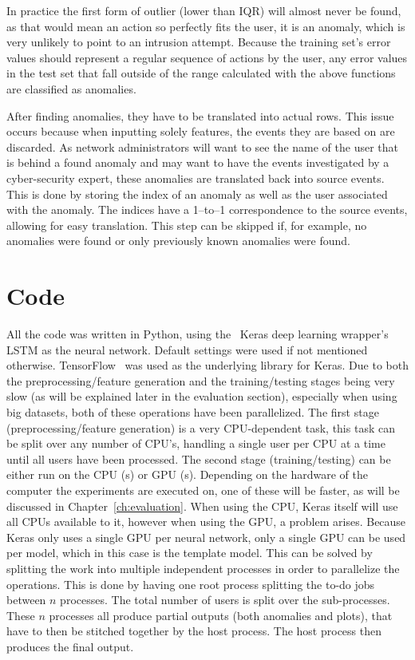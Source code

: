 In practice the first form of outlier (lower than IQR) will almost never be found, as that would mean an action so perfectly fits the user, it is an anomaly, which is very unlikely to point to an intrusion attempt. Because the training set's error values should represent a regular sequence of actions by the user, any error values in the test set that fall outside of the range calculated with the above functions are classified as anomalies.

After finding anomalies, they have to be translated into actual rows. This issue occurs because when inputting solely features, the events they are based on are discarded. As network administrators will want to see the name of the user that is behind a found anomaly and may want to have the events investigated by a cyber-security expert, these anomalies are translated back into source events. This is done by storing the index of an anomaly as well as the user associated with the anomaly. The indices have a 1--to--1 correspondence to the source events, allowing for easy translation. This step can be skipped if, for example, no anomalies were found or only previously known anomalies were found.

\section{Code}
All the code was written in Python, using the~\cite{chollet2015keras} Keras deep learning wrapper's LSTM as the neural network. Default settings were used if not mentioned otherwise. TensorFlow~\cite{tensorflow2015-whitepaper} was used as the underlying library for Keras. Due to both the preprocessing/feature generation and the training/testing stages being very slow (as will be explained later in the evaluation section), especially when using big datasets, both of these operations have been parallelized. The first stage (preprocessing/feature generation) is a very CPU-dependent task, this task can be split over any number of CPU's, handling a single user per CPU at a time until all users have been processed. The second stage (training/testing) can be either run on the CPU (s) or GPU (s). Depending on the hardware of the computer the experiments are executed on, one of these will be faster, as will be discussed in Chapter~\ref{ch:evaluation}. When using the CPU, Keras itself will use all CPUs available to it, however when using the GPU, a problem arises. Because Keras only uses a single GPU per neural network, only a single GPU can be used per model, which in this case is the template model. This can be solved by splitting the work into multiple independent processes in order to parallelize the operations. This is done by having one root process splitting the to-do jobs between \(n\) processes. The total number of users is split over the sub-processes. These \(n\) processes all produce partial outputs (both anomalies and plots), that have to then be stitched together by the host process. The host process then produces the final output.